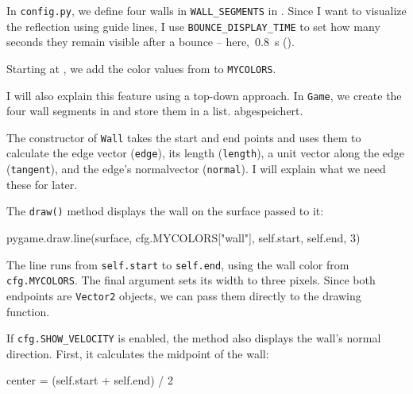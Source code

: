 In \texttt{config.py}, we define four walls in \texttt{WALL\_SEGMENTS} in . Since I want to visualize the reflection using guide lines, I use \texttt{BOUNCE\_DISPLAY\_TIME} to set how many seconds they remain visible after a bounce -- here,~\SI{0.8}{\second} ().

Starting at , we add the color values from  to \texttt{MYCOLORS}.


I will also explain this feature using a top-down approach. In \texttt{Game}, we create the four wall segments in  and store them in a list. abgespeichert.


The constructor of \texttt{Wall} takes the start and end points and uses them to calculate the edge vector (\texttt{edge}), its length (\texttt{length}), a unit vector along the edge (\texttt{tangent}), and the edge's \gls{normalvector} (\texttt{normal}). I will explain what we need these for later.


The \texttt{draw()} method displays the wall on the surface passed to it:
\begin{codebox}
pygame.draw.line(surface, cfg.MYCOLORS["wall"], self.start, self.end, 3)
\end{codebox}

The line runs from \texttt{self.start} to \texttt{self.end}, using the wall color from \texttt{cfg.MYCOLORS}. The final argument sets its width to three pixels. Since both endpoints are \texttt{Vector2} objects, we can pass them directly to the drawing function.

If \texttt{cfg.SHOW\_VELOCITY} is enabled, the method also displays the wall's normal direction. First, it calculates the midpoint of the wall:
\begin{codebox}
	center = (self.start + self.end) / 2
\end{codebox}


